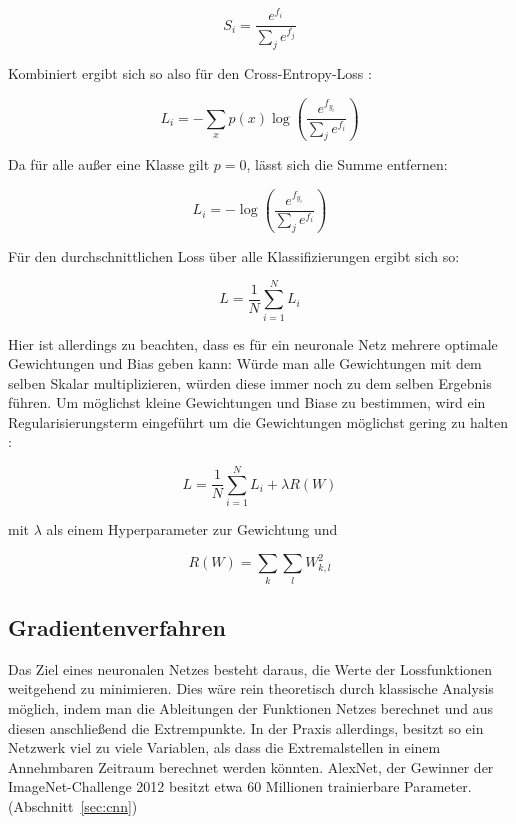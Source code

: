 \begin{equation}
S_i=\frac{e^{f_i}}{\sum_j e^{f_j}}
\end{equation}

Kombiniert ergibt sich so also für den Cross-Entropy-Loss \cite{cs231n}:

\begin{equation}
L_i = -\sum_x p(x)\log\left(\frac{e^{f_{y_i}}}{\sum_j e^{f_i}}\right)
\end{equation}

Da für alle außer eine Klasse gilt $p=0$, lässt sich die Summe entfernen:

\begin{equation}
L_i = -\log\left(\frac{e^{f_{y_i}}}{\sum_j e^{f_i}}\right)
\end{equation}


Für den durchschnittlichen Loss über alle Klassifizierungen ergibt sich so:

\begin{equation}
L = \frac{1}{N}\sum_{i=1}^{N}L_i
\end{equation}

Hier ist allerdings zu beachten, dass es für ein neuronale Netz mehrere optimale Gewichtungen und Bias geben kann: Würde man \bspw alle Gewichtungen mit dem selben Skalar multiplizieren, würden diese immer noch zu dem selben Ergebnis führen. Um möglichst kleine Gewichtungen und Biase zu bestimmen, wird ein Regularisierungsterm eingeführt um die Gewichtungen möglichst gering zu halten \cite{cs231n}:

\begin{equation}
\label{eqn:def_loss}
L = \frac{1}{N}\sum_{i=1}^{N}L_i + \lambda R(W)
\end{equation}

mit $\lambda$ als einem Hyperparameter zur Gewichtung und

\begin{equation}
R(W) = \sum_k\sum_l W^2_{k,l}
\end{equation}

\subsection{Gradientenverfahren}
\label{ssec:gradientenverfahren}

Das Ziel eines neuronalen Netzes besteht daraus, die Werte der Lossfunktionen weitgehend zu minimieren. Dies wäre rein theoretisch durch klassische Analysis möglich, indem man die Ableitungen der Funktionen Netzes berechnet und aus diesen anschließend die Extrempunkte. In der Praxis allerdings, besitzt so ein Netzwerk viel zu viele Variablen, als dass die Extremalstellen in einem Annehmbaren Zeitraum berechnet werden könnten. \cite[Kap.~1]{nielsen_15} AlexNet, der Gewinner der ImageNet-Challenge 2012 besitzt \bspw etwa 60 Millionen trainierbare Parameter. (\Vgl Abschnitt~\ref{sec:cnn})

